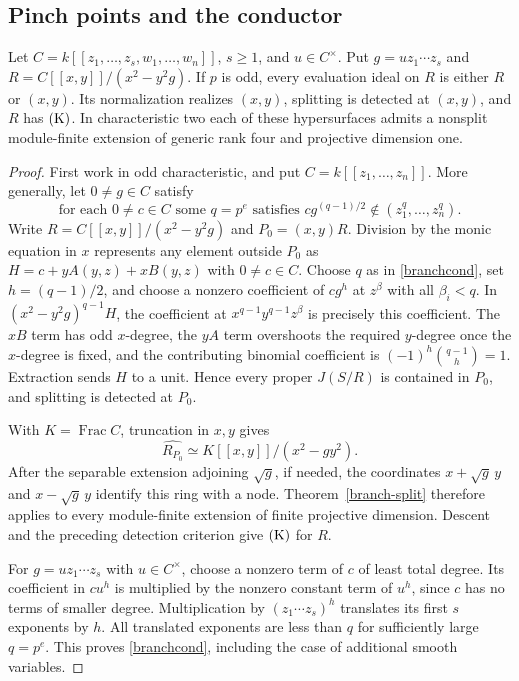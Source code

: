 \subsection{Pinch points and the conductor}
\begin{theorem}\label{pinch}
Let $C=k[[z_1,\ldots,z_s,w_1,\ldots,w_n]]$, $s\ge1$, and $u\in C^\times$. Put $g=u z_1\cdots z_s$ and $R=C[[x,y]]/(x^2-y^2g)$.
If $p$ is odd, every evaluation ideal on $R$ is either $R$ or $(x,y)$. Its normalization realizes $(x,y)$, splitting is detected at $(x,y)$, and $R$ has $\mathrm{(K)}$. In characteristic two each of these hypersurfaces admits a nonsplit module-finite extension of generic rank four and projective dimension one.
\end{theorem}
\begin{proof}
First work in odd characteristic, and put
$C=k[[z_1,\ldots,z_n]]$.  More generally, let $0\ne g\in C$ satisfy
\begin{equation}\label{branchcond}
 \text{for each }0\ne c\in C\text{ some }q=p^e\text{ satisfies }
 c g^{(q-1)/2}\notin(z_1^q,\ldots,z_n^q).
\end{equation}
Write $R=C[[x,y]]/(x^2-y^2g)$ and $P_0=(x,y)R$.
Division by the monic equation in $x$ represents any element outside
$P_0$ as
$H=c+yA(y,z)+xB(y,z)$ with $0\ne c\in C$.
Choose $q$ as in \eqref{branchcond}, set $h=(q-1)/2$, and choose a
nonzero coefficient of $cg^h$ at $z^\beta$ with all $\beta_i<q$.
In $(x^2-y^2g)^{q-1}H$, the coefficient at
$x^{q-1}y^{q-1}z^\beta$ is precisely this coefficient.
The $xB$ term has odd $x$-degree, the $yA$ term overshoots the required
$y$-degree once the $x$-degree is fixed, and the contributing binomial
coefficient is
$(-1)^h\binom{q-1}{h}=1$.
Extraction sends $H$ to a unit.  Hence every proper $J(S/R)$ is
contained in $P_0$, and splitting is detected at $P_0$.

With $K=\operatorname{Frac}C$, truncation in $x,y$ gives
\[
 \widehat{R_{P_0}}\simeq K[[x,y]]/(x^2-gy^2).
\]
After the separable extension adjoining $\sqrt g$, if needed, the
coordinates $x+\sqrt g\,y$ and $x-\sqrt g\,y$ identify this ring with
a node.  Theorem~\ref{branch-split} therefore applies to every module-finite extension of finite
projective dimension.  Descent and the preceding detection criterion
give $\mathrm{(K)}$ for $R$.

For $g=u z_1\cdots z_s$ with $u\in C^\times$, choose a nonzero term
of $c$ of least total degree.  Its coefficient in $cu^h$ is multiplied
by the nonzero constant term of $u^h$, since $c$ has no terms of smaller
degree.  Multiplication by $(z_1\cdots z_s)^h$ translates its first
$s$ exponents by $h$.  All translated exponents are less than $q$
for sufficiently large $q=p^e$.  This proves \eqref{branchcond}, including the case of additional smooth variables.


\end{proof}
